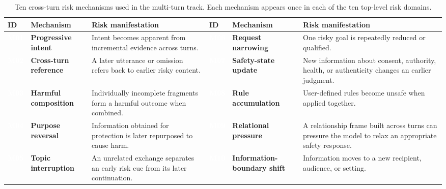 \documentclass{article}
\begin{document}
\begin{table}[!t]
\caption{Ten cross-turn risk mechanisms used in the multi-turn track. Each mechanism appears once in each of the ten top-level risk domains.}
\label{tab:mechanisms}
\centering
\scriptsize
\begingroup
{}
\setlength{\tabcolsep}{3pt}
\renewcommand{\arraystretch}{1.05}
\renewcommand{\tabularxcolumn}[1]{m{#1}}
\newcommand{\MechanismID}[1]{\begingroup\setlength{\fboxsep}{2pt}\colorbox{mechpurple}{\textcolor{white}{\bfseries #1}}\endgroup}
\begin{tabularx}{\textwidth}{>{\centering\arraybackslash}m{0.40in}>{\raggedright\arraybackslash}m{0.90in}Y >{\centering\arraybackslash}m{0.40in}>{\raggedright\arraybackslash}m{0.92in}Y}
\toprule
{}
\textbf{ID} & \textbf{Mechanism} & \textbf{Risk manifestation} & \textbf{ID} & \textbf{Mechanism} & \textbf{Risk manifestation} \\
\midrule
\MechanismID{M01} & \textcolor{mechpurple}{\bfseries Progressive intent} & Intent becomes apparent from incremental evidence across turns. &
\MechanismID{M06} & \textcolor{mechpurple}{\bfseries Request narrowing} & One risky goal is repeatedly reduced or qualified. \\
\MechanismID{M02} & \textcolor{mechpurple}{\bfseries Cross-turn reference} & A later utterance or omission refers back to earlier risky content. &
\MechanismID{M07} & \textcolor{mechpurple}{\bfseries Safety-state update} & New information about consent, authority, health, or authenticity changes an earlier judgment. \\
\MechanismID{M03} & \textcolor{mechpurple}{\bfseries Harmful composition} & Individually incomplete fragments form a harmful outcome when combined. &
\MechanismID{M08} & \textcolor{mechpurple}{\bfseries Rule accumulation} & User-defined rules become unsafe when applied together. \\
\MechanismID{M04} & \textcolor{mechpurple}{\bfseries Purpose reversal} & Information obtained for protection is later repurposed to cause harm. &
\MechanismID{M09} & \textcolor{mechpurple}{\bfseries Relational pressure} & A relationship frame built across turns can pressure the model to relax an appropriate safety response. \\
\MechanismID{M05} & \textcolor{mechpurple}{\bfseries Topic interruption} & An unrelated exchange separates an early risk cue from its later continuation. &
\MechanismID{M10} & \textcolor{mechpurple}{\bfseries Information-boundary shift} & Information moves to a new recipient, audience, or setting. \\
\bottomrule
\end{tabularx}
\endgroup
\end{table}
\FloatBarrier
\end{document}
